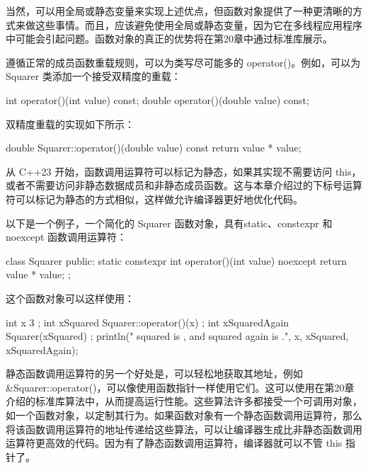 当然，可以用全局或静态变量来实现上述优点，但函数对象提供了一种更清晰的方式来做这些事情。而且，应该避免使用全局或静态变量，因为它在多线程应用程序中可能会引起问题。函数对象的真正的优势将在第20章中通过标准库展示。

遵循正常的成员函数重载规则，可以为类写尽可能多的 operator()。例如，可以为 Squarer 类添加一个接受双精度的重载：

\begin{cpp}
int operator()(int value) const;
double operator()(double value) const;
\end{cpp}

双精度重载的实现如下所示：

\begin{cpp}
double Squarer::operator()(double value) const { return value * value; }
\end{cpp}



从 C++23 开始，函数调用运算符可以标记为静态，如果其实现不需要访问 this，或者不需要访问非静态数据成员和非静态成员函数。这与本章介绍过的下标号运算符可以标记为静态的方式相似，这样做允许编译器更好地优化代码。

以下是一个例子，一个简化的 Squarer 函数对象，具有static、constexpr 和 noexcept 函数调用运算符：

\begin{cpp}
class Squarer
{
    public:
        static constexpr int operator()(int value) noexcept
        {
            return value * value;
        }
};
\end{cpp}

这个函数对象可以这样使用：

\begin{cpp}
int x { 3 };
int xSquared { Squarer::operator()(x) };
int xSquaredAgain { Squarer{}(xSquared) };
println("{} squared is {}, and squared again is {}.", x, xSquared, xSquaredAgain);
\end{cpp}

静态函数调用运算符的另一个好处是，可以轻松地获取其地址，例如 \&Squarer::operator()，可以像使用函数指针一样使用它们。这可以使用在第20章介绍的标准库算法中，从而提高运行性能。这些算法许多都接受一个可调用对象，如一个函数对象，以定制其行为。如果函数对象有一个静态函数调用运算符，那么将该函数调用运算符的地址传递给这些算法，可以让编译器生成比非静态函数调用运算符更高效的代码。因为有了静态函数调用运算符，编译器就可以不管 this 指针了。






















